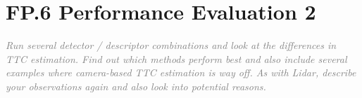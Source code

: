 \documentclass[a4paper]{scrartcl}
\begin{document}
\section*{FP.6 Performance Evaluation 2}
\textcolor{gray}{\textit{Run several detector / descriptor combinations and look at the differences in TTC estimation. Find out which methods perform best and also include several examples where camera-based TTC estimation is way off. As with Lidar, describe your observations again and also look into potential reasons.}}
\end{document}
